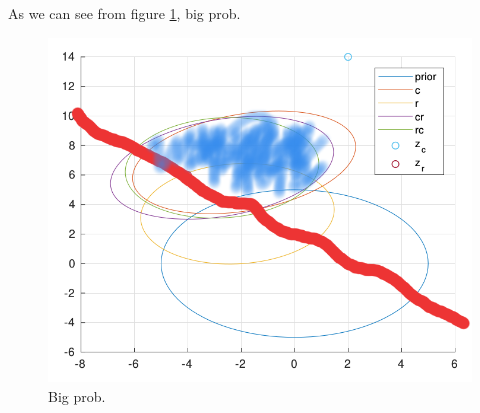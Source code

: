 \documentclass[]{article}
\begin{document}
\setcounter{subsection}{7}
\subsection{}
As we can see from figure \ref{fig:bigprob}, big prob.
\begin{figure}[H]
\centering
\includegraphics[width=\columnwidth]{bigprob.png}
\caption{Big prob.}
\label{fig:bigprob}
\end{figure}
\end{document}
